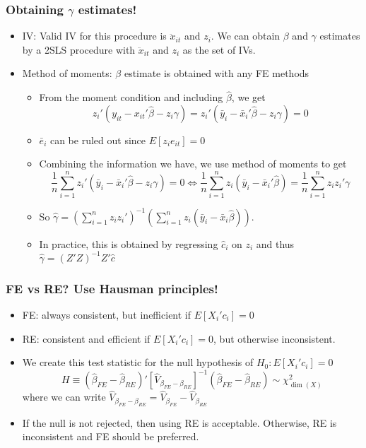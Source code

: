 \documentclass[aspectratio=169]{beamer}
\begin{document}
\begin{frame}
\frametitle{Obtaining $\gamma$ estimates!}
\begin{itemize}
\item IV: Valid IV for this procedure is $\ddot{x}_{it}$ and $z_i$. We can obtain $\beta$ and $\gamma$ estimates by a 2SLS procedure with $\ddot{x}_{it}$ and $z_i$ as the set of IVs.
\item Method of moments: $\beta$ estimate is obtained with any FE methods
\begin{itemize}
\item From the moment condition and including $\hat{\beta}$, we get 
\[
z_i'(y_{it}-x_{it}'\hat{\beta}-z_i\gamma)=z_i'(\bar{y}_{i}-\bar{x}_{i}'\hat{\beta}-z_i\gamma)=0
\]
\item $\bar{e}_i$ can be ruled out since $E[z_{i}e_{it}]=0$
\item Combining the information we have, we use method of moments to get
\[
\frac{1}{n}\sum_{i=1}^n z_i'(\bar{y}_{i}-\bar{x}_{i}'\hat{\beta}-z_i\gamma)=0 \iff \frac{1}{n}\sum_{i=1}^nz_i(\bar{y}_i-\bar{x}_i'\hat{\beta})=\frac{1}{n}\sum_{i=1}^n z_iz_i'\gamma
\]
\item So $\hat{\gamma}=\left(\sum_{i=1}^n z_iz_i'\right)^{-1}\left(\sum_{i=1}^nz_i (\bar{y}_i-\bar{x}_i\hat{\beta})\right)$. 
\item In practice, this is obtained by regressing $\hat{c}_i$ on $z_i$ and thus $\hat{\gamma}=(Z'Z)^{-1} Z'\hat{c}$
\end{itemize}
 \end{itemize}
\end{frame}

\begin{frame}
\frametitle{FE vs RE? Use Hausman principles!}
\begin{itemize}
\item FE: always consistent, but inefficient if $E[X_i'c_i]=0$
\item RE: consistent and efficient if $E[X_i'c_i]=0$, but otherwise inconsistent. 
\item We create this test statistic for the null hypothesis of $H_0:E[X_i'c_i]=0$
\[
H\equiv (\hat{\beta}_{FE}-\hat{\beta}_{RE})'[\widehat{V}_{\beta_{FE}-\beta_{RE}}]^{-1}(\hat{\beta}_{FE}-\hat{\beta}_{RE})\sim \chi^2_{\dim{(X)}}
\]
where we can write $\widehat{V}_{\beta_{FE}-\beta_{RE}}=\widehat{V}_{\beta_{FE}}-\widehat{V}_{\beta_{RE}}$
\item  If the null is not rejected, then using RE is acceptable. Otherwise, RE is inconsistent and FE should be preferred.
 \end{itemize}
\end{frame}
\end{document}
